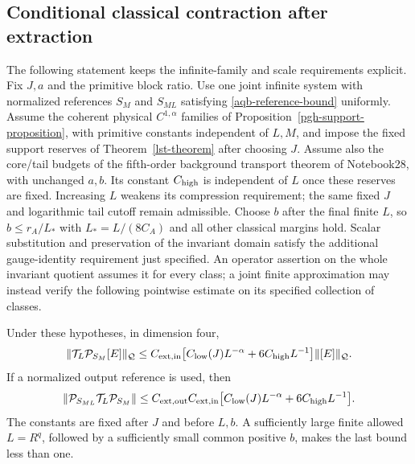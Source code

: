 \subsection{Conditional classical contraction after extraction}
\label{aqb-contraction-section}

The following statement keeps the infinite-family and scale
requirements explicit. Fix $J,a$ and the primitive block ratio.
Use one joint infinite system with normalized references $S_M$
and $S_{ML}$ satisfying \eqref{aqb-reference-bound} uniformly.
Assume the coherent physical $C^{1,\alpha}$ families of
Proposition~\ref{pgh-support-proposition}, with primitive
constants independent of $L,M$, and impose the fixed support
reserves of Theorem~\ref{lst-theorem} after choosing $J$.
Assume also the core/tail budgets of the fifth-order background
transport theorem of Notebook28, with unchanged $a,b$.
Its constant $C_{\rm high}$ is independent of $L$ once these
reserves are fixed. Increasing $L$ weakens its compression
requirement; the same fixed $J$ and logarithmic tail cutoff
remain admissible. Choose $b$ after the final finite $L$, so
$b\le r_A/L_*$ with $L_*=L/(8C_A)$ and all other classical
margins hold. Scalar substitution and preservation of the
invariant domain satisfy the additional gauge-identity requirement
just specified. An operator assertion on the whole invariant
quotient assumes it for every class; a joint finite approximation
may instead verify the following pointwise estimate on its
specified collection of classes.

\begin{theorem}
\label{aqb-classical-theorem}
Under these hypotheses, in dimension four,
\begin{equation}
 \|\mathcal T_L\mathcal P_{S_M}[E]\|_{\mathcal Q}
 \le C_{{\rm ext,in}}
       \bigl[C_{\rm low}(J)L^{-\alpha}
                    +6C_{\rm high}L^{-1}\bigr]
                     \|[E]\|_{\mathcal Q}.
 \label{aqb-classical-bound}
\end{equation}
If a normalized output reference is used, then
\begin{equation}
 \|\mathcal P_{S_{ML}}\mathcal T_L\mathcal P_{S_M}\|
 \le C_{{\rm ext,out}}C_{{\rm ext,in}}
       \bigl[C_{\rm low}(J)L^{-\alpha}
                    +6C_{\rm high}L^{-1}\bigr].
 \label{aqb-projected-contraction}
\end{equation}
The constants are fixed after $J$ and before $L,b$. A sufficiently
large finite allowed $L=R^q$, followed by a sufficiently small
common positive $b$, makes the last bound less than one.
\end{theorem}

